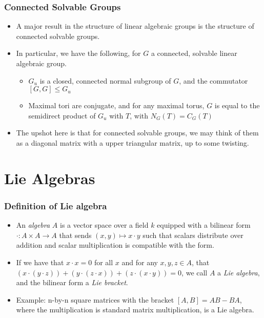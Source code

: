 \documentclass{beamer}
\theoremstyle{remark}
\begin{document}
\begin{frame}
  \frametitle{Connected Solvable Groups} 

  \begin{itemize}
  \item A major result in the structure of linear algebraic groups is the structure of connected solvable groups.
  \pause
  \item In particular, we have the following, for $G$ a connected, solvable linear algebraic group.
  \begin{itemize}
  \pause
  \item $G_u$ is a closed, connected normal subgroup of $G$, and the commutator $[G,G] \leq G_u$
  \pause
  \item Maximal tori are conjugate, and for any maximal torus, $G$ is equal to the semidirect product of $G_u$ with $T$, with $N_G(T) = C_G(T)$
  \end{itemize}
  \pause
  \item The upshot here is that for connected solvable groups, we may think of them as a diagonal matrix with a upper triangular matrix, up to some twisting.
  \end{itemize}
  
\end{frame}

\section{Lie Algebras}

\begin{frame}
  \frametitle{Definition of Lie algebra} 
  \begin{itemize}
  \item An \emph{algebra} $A$ is a vector space over a field $k$ equipped with a bilinear form $\cdot: A \times A \to A$ that sends $(x,y) \mapsto x \cdot y$ such that scalars distribute over addition and scalar multiplication is compatible with the form.
    \pause
  \item If we have that $x \cdot x = 0$ for all $x$ and for any $x, y, z \in A$, that  $(x \cdot (y \cdot z)) +  (y \cdot (z \cdot x)) +  (z \cdot (x \cdot y)) = 0$, we call $A$ a \emph{Lie algebra}, and the bilinear form a \emph{Lie bracket}.
  \pause
  \item Example: n-by-n square matrices with the bracket $[A, B] = AB  - BA$, where the multiplication is standard matrix multiplication, is a Lie algebra.
  \end{itemize} 
\end{frame}
\end{document}
